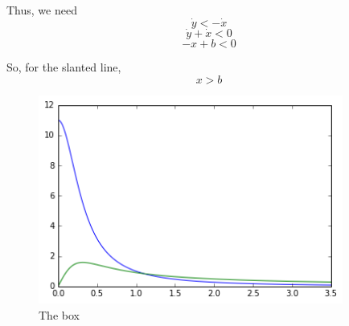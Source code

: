 \documentclass[a4paper,12pt]{article}
\begin{document}
\begin{enumerate}
Thus, we need
\[ \dot{y} < - \dot{x}\] 
\[ \dot{y} + \dot{x}<0\] 
\[-x+b<0\]

So, for the slanted line,
\[x>b\]

\begin{figure}[H] 
	\centering
	\includegraphics[width=10cm]{xdot}
	\caption{The box }
\end{figure}

	\end{enumerate} 
\end{document}
